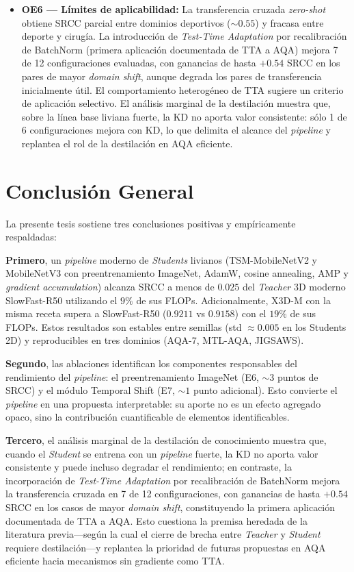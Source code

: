 \begin{itemize}
    \item \textbf{OE6 — Límites de aplicabilidad:} La transferencia cruzada \textit{zero-shot} obtiene \ac{SRCC} parcial entre dominios deportivos ($\sim 0.55$) y fracasa entre deporte y cirugía. La introducción de \textit{Test-Time Adaptation} por recalibración de BatchNorm (primera aplicación documentada de TTA a \ac{AQA}) mejora 7 de 12 configuraciones evaluadas, con ganancias de hasta $+0.54$ \ac{SRCC} en los pares de mayor \textit{domain shift}, aunque degrada los pares de transferencia inicialmente útil. El comportamiento heterogéneo de TTA sugiere un criterio de aplicación selectivo. El análisis marginal de la destilación muestra que, sobre la línea base liviana fuerte, la \ac{KD} no aporta valor consistente: sólo 1 de 6 configuraciones mejora con \ac{KD}, lo que delimita el alcance del \textit{pipeline} y replantea el rol de la destilación en \ac{AQA} eficiente.
\end{itemize}

\section{Conclusión General}

La presente tesis sostiene tres conclusiones positivas y empíricamente respaldadas:

\textbf{Primero}, un \textit{pipeline} moderno de \textit{Students} livianos (TSM-MobileNetV2 y MobileNetV3 con preentrenamiento ImageNet, AdamW, cosine annealing, AMP y \textit{gradient accumulation}) alcanza \ac{SRCC} a menos de $0.025$ del \textit{Teacher} 3D moderno SlowFast-R50 utilizando el $9\%$ de sus \ac{FLOPs}. Adicionalmente, X3D-M con la misma receta supera a SlowFast-R50 ($0.9211$ vs $0.9158$) con el $19\%$ de sus \ac{FLOPs}. Estos resultados son estables entre semillas (std $\approx 0.005$ en los Students 2D) y reproducibles en tres dominios (AQA-7, MTL-AQA, JIGSAWS).

\textbf{Segundo}, las ablaciones identifican los componentes responsables del rendimiento del \textit{pipeline}: el preentrenamiento ImageNet (E6, $\sim 3$ puntos de \ac{SRCC}) y el módulo Temporal Shift (E7, $\sim 1$ punto adicional). Esto convierte el \textit{pipeline} en una propuesta interpretable: su aporte no es un efecto agregado opaco, sino la contribución cuantificable de elementos identificables.

\textbf{Tercero}, el análisis marginal de la destilación de conocimiento muestra que, cuando el \textit{Student} se entrena con un \textit{pipeline} fuerte, la \ac{KD} no aporta valor consistente y puede incluso degradar el rendimiento; en contraste, la incorporación de \textit{Test-Time Adaptation} por recalibración de BatchNorm mejora la transferencia cruzada en 7 de 12 configuraciones, con ganancias de hasta $+0.54$ \ac{SRCC} en los casos de mayor \textit{domain shift}, constituyendo la primera aplicación documentada de TTA a \ac{AQA}. Esto cuestiona la premisa heredada de la literatura previa---según la cual el cierre de brecha entre \textit{Teacher} y \textit{Student} requiere destilación---y replantea la prioridad de futuras propuestas en \ac{AQA} eficiente hacia mecanismos sin gradiente como TTA.

